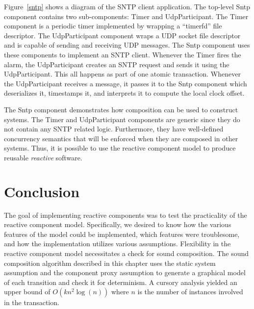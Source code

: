 Figure~\ref{sntp} shows a diagram of the SNTP client application.
The top-level Sntp component contains two sub-components:  Timer and UdpParticipant.
The Timer component is a periodic timer implemented by wrapping a ``timerfd'' file descriptor.
The UdpParticipant component wraps a UDP socket file descriptor and is capable of sending and receiving UDP messages.
The Sntp component uses these components to implement an SNTP client.
Whenever the Timer fires the alarm, the UdpParticipant creates an SNTP request and sends it using the UdpParticipant.
This all happens as part of one atomic transaction.
Whenever the UdpParticipant receives a message, it passes it to the Sntp component which deserializes it, timestamps it, and interprets it to compute the local clock offset.

The Sntp component demonstrates how composition can be used to construct systems.
The Timer and UdpParticipant components are generic since they do not contain any SNTP related logic.
Furthermore, they have well-defined concurrency semantics that will be enforced when they are composed in other systems.
Thus, it is possible to use the reactive component model to produce reusable \emph{reactive} software.

\section{Conclusion}

The goal of implementing reactive components was to test the practicality of the reactive component model.
Specifically, we desired to know how the various features of the model could be implemented, which features were troublesome, and how the implementation utilizes various assumptions.
Flexibility in the reactive component model necessitates a check for sound composition.
The sound composition algorithm described in this chapter uses the static system assumption and the component proxy assumption to generate a graphical model of each transition and check it for determinism.
A cursory analysis yielded an upper bound of $O(k n^2 \log (n))$ where $n$ is the number of instances involved in the transaction.

